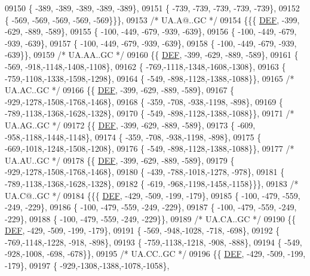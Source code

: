 \begin{DoxyCode}
09150 \{ -389, -389, -389, -389, -389\},
09151 \{ -739, -739, -739, -739, -739\},
09152 \{ -569, -569, -569, -569, -569\}\}\},
09153 \textcolor{comment}{/* UA.A@..GC */}
09154 \{\{\{  \mbox{\hyperlink{1_88_84__epars_8h_a397419fc12b37ed479c8abb9d444d843}{DEF}}, -399, -629, -889, -589\},
09155 \{ -100, -449, -679, -939, -639\},
09156 \{ -100, -449, -679, -939, -639\},
09157 \{ -100, -449, -679, -939, -639\},
09158 \{ -100, -449, -679, -939, -639\}\},
09159 \textcolor{comment}{/* UA.AA..GC */}
09160 \{\{  \mbox{\hyperlink{1_88_84__epars_8h_a397419fc12b37ed479c8abb9d444d843}{DEF}}, -399, -629, -889, -589\},
09161 \{ -569, -918,-1148,-1408,-1108\},
09162 \{ -769,-1118,-1348,-1608,-1308\},
09163 \{ -759,-1108,-1338,-1598,-1298\},
09164 \{ -549, -898,-1128,-1388,-1088\}\},
09165 \textcolor{comment}{/* UA.AC..GC */}
09166 \{\{  \mbox{\hyperlink{1_88_84__epars_8h_a397419fc12b37ed479c8abb9d444d843}{DEF}}, -399, -629, -889, -589\},
09167 \{ -929,-1278,-1508,-1768,-1468\},
09168 \{ -359, -708, -938,-1198, -898\},
09169 \{ -789,-1138,-1368,-1628,-1328\},
09170 \{ -549, -898,-1128,-1388,-1088\}\},
09171 \textcolor{comment}{/* UA.AG..GC */}
09172 \{\{  \mbox{\hyperlink{1_88_84__epars_8h_a397419fc12b37ed479c8abb9d444d843}{DEF}}, -399, -629, -889, -589\},
09173 \{ -609, -958,-1188,-1448,-1148\},
09174 \{ -359, -708, -938,-1198, -898\},
09175 \{ -669,-1018,-1248,-1508,-1208\},
09176 \{ -549, -898,-1128,-1388,-1088\}\},
09177 \textcolor{comment}{/* UA.AU..GC */}
09178 \{\{  \mbox{\hyperlink{1_88_84__epars_8h_a397419fc12b37ed479c8abb9d444d843}{DEF}}, -399, -629, -889, -589\},
09179 \{ -929,-1278,-1508,-1768,-1468\},
09180 \{ -439, -788,-1018,-1278, -978\},
09181 \{ -789,-1138,-1368,-1628,-1328\},
09182 \{ -619, -968,-1198,-1458,-1158\}\}\},
09183 \textcolor{comment}{/* UA.C@..GC */}
09184 \{\{\{  \mbox{\hyperlink{1_88_84__epars_8h_a397419fc12b37ed479c8abb9d444d843}{DEF}}, -429, -509, -199, -179\},
09185 \{ -100, -479, -559, -249, -229\},
09186 \{ -100, -479, -559, -249, -229\},
09187 \{ -100, -479, -559, -249, -229\},
09188 \{ -100, -479, -559, -249, -229\}\},
09189 \textcolor{comment}{/* UA.CA..GC */}
09190 \{\{  \mbox{\hyperlink{1_88_84__epars_8h_a397419fc12b37ed479c8abb9d444d843}{DEF}}, -429, -509, -199, -179\},
09191 \{ -569, -948,-1028, -718, -698\},
09192 \{ -769,-1148,-1228, -918, -898\},
09193 \{ -759,-1138,-1218, -908, -888\},
09194 \{ -549, -928,-1008, -698, -678\}\},
09195 \textcolor{comment}{/* UA.CC..GC */}
09196 \{\{  \mbox{\hyperlink{1_88_84__epars_8h_a397419fc12b37ed479c8abb9d444d843}{DEF}}, -429, -509, -199, -179\},
09197 \{ -929,-1308,-1388,-1078,-1058\},

\end{DoxyCode}
